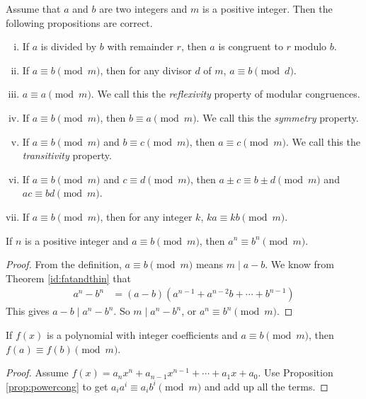 \begin{proposition}
	Assume that $a$ and $b$ are two integers and $m$ is a positive integer. Then the following propositions are correct.
		\begin{enumerate}[i.]
			\item If $a$ is divided by $b$ with remainder $r$, then $a$ is congruent to $r$ modulo $b$.
			\item If $a\equiv b\pmod m$, then for any divisor $d$ of $m$, $a\equiv b\pmod d$.
			\item $a \equiv a \pmod m$. We call this the \textit{reflexivity} property of modular congruences.
			\item If $a \equiv b \pmod m$, then $b \equiv a \pmod m$. We call this the \textit{symmetry} property.
			\item If $a \equiv b \pmod m$ and $b \equiv c \pmod m$, then $a \equiv c \pmod m$. We call this the \textit{transitivity} property.
			\item If $a \equiv b \pmod m$ and $c \equiv d \pmod m$, then $a\pm c \equiv b \pm d \pmod m$ and $ac \equiv bd \pmod m$.
			\item If $a \equiv b \pmod m$, then for any integer $k$, $ka \equiv kb \pmod m$.
		\end{enumerate}
\end{proposition}

\begin{proposition}\label{prop:powercong}
	If $n$ is a positive integer and $a \equiv b \pmod m$, then $a^n \equiv b^n \pmod m$.
\end{proposition}

\begin{proof}
	From the definition, $a \equiv b \pmod m$ means $m\mid a-b$. We know from Theorem \ref{id:fatandthin} that
	\begin{align*}
		a^n-b^n & = (a-b)\left(a^{n-1}+a^{n-2}b+\cdots+b^{n-1}\right)
	\end{align*}
	This gives $a-b\mid a^n-b^n$. So $m\mid a^n - b^n$, or $a^n \equiv b^n \pmod m$.
\end{proof}

\begin{proposition}
	If $f(x)$ is a polynomial with integer coefficients and $a \equiv b \pmod m$, then $f(a) \equiv f(b) \pmod m$.
\end{proposition}

\begin{proof}
	Assume $f(x)=a_n x^n + a_{n-1} x^{n-1} + \cdots + a_1 x + a_0$. Use Proposition \eqref{prop:powercong} to get $a_i a^i \equiv a_i b^i \pmod m$ and add up all the terms.
\end{proof}


